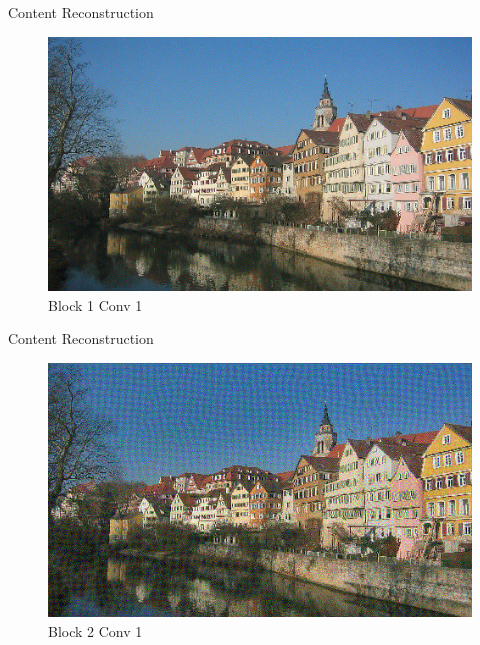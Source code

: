 \documentclass{beamer}
\begin{document}
\begin{frame}{Content Reconstruction}
\begin{figure}[ht]
\centering
\caption{Block 1 Conv 1}
\includegraphics[width=\textwidth]{img/content/block1_conv1.png}
\end{figure}
\end{frame}

\begin{frame}{Content Reconstruction}
\begin{figure}[ht]
\centering
\caption{Block 2 Conv 1}
\includegraphics[width=\textwidth]{img/content/block2_conv1.png}
\end{figure}
\end{frame}
\end{document}
